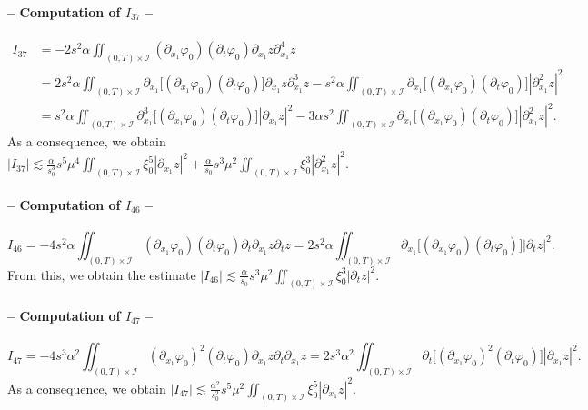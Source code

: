 \documentclass[a4paper, 12pt]{article}
\theoremstyle{plain}
\theoremstyle{definition}
\numberwithin{theorem}{section}
\numberwithin{equation}{section}
\begin{document}
{\paragraph{-- Computation of $I_{37}$ --}
\begin{align*}
    I_{37}&=-2s^2\alpha\iint_{(0,T)\times\mathcal{I}}(\partial_{x_1}\varphi_0)(\partial_t\varphi_0)\partial_{x_1}z\partial^4_{x_1}z\\
    &=2s^2\alpha\iint_{(0,T)\times\mathcal{I}}\partial_{x_1}\big[(\partial_{x_1}\varphi_0)(\partial_t\varphi_0)\big]\partial_{x_1}z\partial^3_{x_1}z-s^2\alpha\iint_{(0,T)\times\mathcal{I}}\partial_{x_1}\big[(\partial_{x_1}\varphi_0)(\partial_t\varphi_0)\big]|\partial^2_{x_1}z|^2\\
    &=s^2\alpha\iint_{(0,T)\times\mathcal{I}}\partial_{x_1}^3\big[(\partial_{x_1}\varphi_0)(\partial_t\varphi_0)\big]|\partial_{x_1}z|^2 -3\alpha s^2\iint_{(0,T)\times\mathcal{I}}\partial_{x_1}\big[(\partial_{x_1}\varphi_0)(\partial_t\varphi_0)\big]|\partial^2_{x_1}z|^2.
\end{align*}
As a consequence, we obtain
$ \displaystyle
    |I_{37}|\lesssim \frac{\alpha}{s_0^3} s^5\mu^4\iint_{(0,T)\times\mathcal{I}}\xi_0^{5}|\partial_{x_1}z|^2+\frac{\alpha}{s_0} s^3\mu^2\iint_{(0,T)\times\mathcal{I}}\xi_0^{3}|\partial^2_{x_1}z|^2.
$
\paragraph{-- Computation of $I_{46}$ --}
$$
I_{46}=-4s^2\alpha\iint_{(0,T)\times\mathcal{I}}(\partial_{x_1}\varphi_0)(\partial_t\varphi_0)\partial_t\partial_{x_1}z\partial_tz=2s^2\alpha \iint_{(0,T)\times\mathcal{I}}\partial_{x_1}\big[(\partial_{x_1}\varphi_0)(\partial_t\varphi_0)\big]|\partial_tz|^2.$$
From this, we obtain the estimate
$
\displaystyle |I_{46}| \lesssim \frac{\alpha}{s_0} s^3\mu^2\iint_{(0,T)\times\mathcal{I}}\xi_0^{3}|\partial_tz|^2.
$
\paragraph{-- Computation of $I_{47}$ --}
$$
I_{47}=-4s^3\alpha^2\iint_{(0,T)\times\mathcal{I}}(\partial_{x_1}\varphi_0)^2(\partial_t\varphi_0)\partial_{x_1}z\partial_t\partial_{x_1}z=2s^3\alpha^2\iint_{(0,T)\times\mathcal{I}}\partial_t\big[(\partial_{x_1}\varphi_0)^2(\partial_t\varphi_0)\big]|\partial_{x_1}z|^2.$$
As a consequence, we obtain $
\displaystyle |I_{47}|\lesssim \frac{\alpha^2}{s_0^2} s^5\mu^2\iint_{(0,T)\times\mathcal{I}}\xi_0^{5}|\partial_{x_1}z|^2.
$
}
\end{document}

